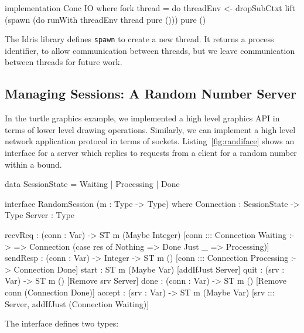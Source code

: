 \small
\begin{code}
implementation Conc IO where
  fork thread = do threadEnv <- dropSubCtxt
                   lift (spawn (do runWith threadEnv thread
                                   pure ()))
                   pure ()

\end{code}
\normalsize

The Idris library defines \texttt{spawn} to create a new thread. It
returns a process identifier, to allow communication between threads, but
we leave communication between threads for future work.

\subsection{Managing Sessions: A Random Number Server}

\label{sect:randserver}

In the turtle graphics example, we implemented a high level
graphics API in terms of lower level drawing operations. Similarly, we can
implement a high level network application protocol in terms of sockets.
Listing~\ref{fig:randiface} shows an interface for a server which replies
to requests from a client for a random number within a bound. 

\small
\begin{code}[float=h, frame=single,caption={An interface for a server which
returns random numbers within a given bound},
label=fig:randiface]
data SessionState = Waiting | Processing | Done

interface RandomSession (m : Type -> Type) where
  Connection : SessionState -> Type
  Server : Type

  recvReq : (conn : Var) ->
    ST m (Maybe Integer) [conn ::: Connection Waiting :->
                           \res => Connection (case res of
                                                    Nothing => Done
                                                    Just _ => Processing)]
  sendResp : (conn : Var) -> Integer ->
             ST m () [conn ::: Connection Processing :-> Connection Done]
  start : ST m (Maybe Var) [addIfJust Server]
  quit : (srv : Var) -> ST m () [Remove srv Server]
  done : (conn : Var) -> ST m () [Remove conn (Connection Done)]
  accept : (srv : Var) ->
           ST m (Maybe Var) [srv ::: Server, addIfJust (Connection Waiting)]
\end{code}
\normalsize

The interface defines two types:

